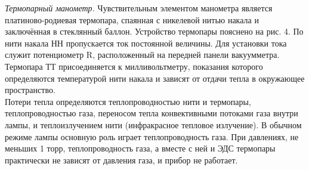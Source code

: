 \documentclass[12pt,a4paper]{article}
\begin{document}
\textit{Термопарный манометр.} Чувствительным элементом манометра является платиново-родиевая термопара, спаянная с никелевой нитью накала и заключённая в стеклянный баллон. Устройство термопары пояснено на рис. 4. По нити накала НН пропускается ток постоянной величины. Для установки тока служит потенциометр R, расположенный на передней панели вакуумметра. Термопара ТТ присоединяется к милливольтметру, показания которого определяются \linebreak температурой нити накала и зависят от отдачи тепла в окружающее пространство. \\

Потери тепла определяются теплопроводностью нити и термопары, теплопроводностью газа, переносом тепла конвективными потоками газа внутри лампы, и \linebreak теплоизлучением нити (инфракрасное тепловое излучение). В обычном режиме лампы основную роль играет \linebreak теплопроводность газа. При давлениях, не меньших 1 торр, теплопроводность газа, а вместе с ней и ЭДС термопары практически не зависят от давления газа, и прибор не работает. \\
\end{document}
